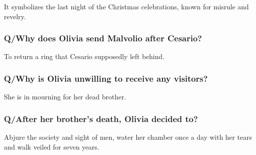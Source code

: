 \documentclass[12pt, a4paper]{article}
\begin{document}
It symbolizes the last night of the Christmas celebrations, known for misrule and revelry.

\subsubsection*{Q/Why does Olivia send Malvolio after Cesario?}

To return a ring that Cesario supposedly left behind.
 
\subsubsection*{Q/Why is Olivia unwilling to receive any visitors?}

She is in mourning for her dead brother.

\subsubsection*{Q/After her brother's death, Olivia decided to?}

Abjure the society and sight of men, water her chamber once a day with her tears and walk veiled for seven years.

\newpage
\section*{}
\end{document}
